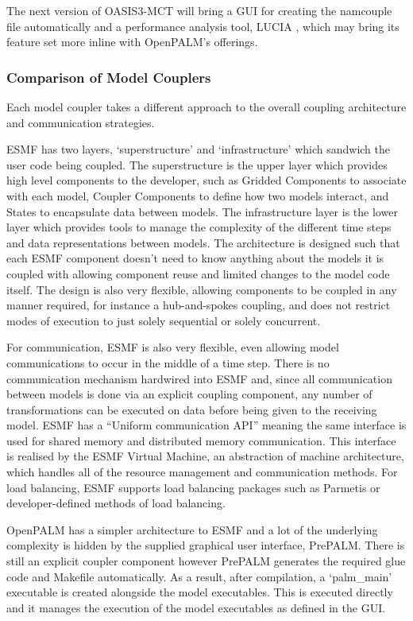 \documentclass{acm_proc_article-sp}
\begin{document}
The next version of OASIS3-MCT will bring a GUI for creating the namcouple file
automatically and a performance analysis tool, LUCIA \cite{Maisonnave}, which
may bring its feature set more inline with OpenPALM's offerings.

\subsubsection{Comparison of Model Couplers}

Each model coupler takes a different approach to the overall coupling
architecture and communication strategies.

ESMF has two layers, `superstructure' and `infrastructure' which sandwich the
user code being coupled. The superstructure is the upper layer which provides
high level components to the developer, such as Gridded Components to associate
with each model, Coupler Components to define how two models interact, and
States to encapsulate data between models. The infrastructure layer is the lower
layer which provides tools to manage the complexity of the different time steps
and data representations between models. The architecture is designed such that
each ESMF component doesn't need to know anything about the models it is coupled
with allowing component reuse and limited changes to the model code itself. The
design is also very flexible, allowing components to be coupled in any manner
required, for instance a hub-and-spokes coupling, and does not restrict modes of
execution to just solely sequential or solely concurrent.

For communication, ESMF is also very flexible, even allowing model
communications to occur in the middle of a time step. There is no communication
mechanism hardwired into ESMF and, since all communication between models is
done via an explicit coupling component, any number of transformations can be
executed on data before being given to the receiving model. ESMF has a ``Uniform
communication API'' \cite{ESMF2014} meaning the same interface is used for
shared memory and distributed memory communication. This interface is realised
by the ESMF Virtual Machine, an abstraction of machine architecture, which
handles all of the resource management and communication methods. For load
balancing, ESMF supports load balancing packages such as Parmetis
\cite{Hoefler2010,Karypis1998} or developer-defined methods of load balancing.

OpenPALM has a simpler architecture to ESMF and a lot of the underlying
complexity is hidden by the supplied graphical user interface, PrePALM. There is
still an explicit coupler component however PrePALM generates the required glue
code and Makefile automatically. As a result, after compilation, a `palm\_main'
executable is created alongside the model executables. This is executed directly
and it manages the execution of the model executables as defined in the GUI.
\end{document}
